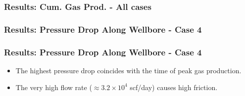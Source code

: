 

\begin{frame}
    \frametitle{Results: Cum. Gas Prod. - All cases}
    \centerline{}
\end{frame}

\begin{frame}
    \frametitle{Results: Pressure Drop Along Wellbore - Case 4}
    \centerline{}
\end{frame}

\begin{frame}
    \frametitle{Results: Pressure Drop Along Wellbore - Case 4}
    \begin{itemize}
        \item The highest pressure drop coincides with the time of peak gas production.
        \item The very high flow rate ($\approx 3.2 \times 10^4$ scf/day) causes high friction.
    \end{itemize}
\end{frame}

